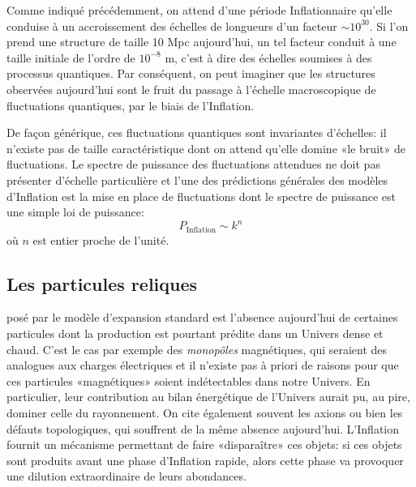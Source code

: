 Comme indiqué précédemment, on attend d'une période Inflationnaire qu'elle conduise à un accroissement des échelles de longueurs d'un facteur $\sim 10^{30}$. Si l'on prend une structure de taille 10 Mpc aujourd'hui, un tel facteur conduit à  une taille initiale de l'ordre de $10^{-8}$ m, c'est à dire des échelles soumises à des processus quantiques. Par conséquent, on peut imaginer que les structures observées aujourd'hui sont le fruit du passage à l'échelle macroscopique de fluctuations quantiques, par le biais de l'Inflation. 

De façon générique, ces fluctuations quantiques sont invariantes d'échelles: il n'existe pas de taille caractéristique dont on attend qu'elle domine «le bruit» de fluctuations. Le spectre de puissance des fluctuations attendues ne doit pas présenter d'échelle particulière et l'une des prédictions générales des modèles d'Inflation est la mise en place de fluctuations dont le spectre de puissance est une simple loi de puissance:
\begin{equation}
P_\mathrm{Inflation}\sim k^n
\end{equation}
où $n$ est entier proche de l'unité.

\subsection{Les particules reliques}
 posé par le modèle d'expansion standard est l'absence aujourd'hui de certaines particules dont la production est pourtant prédite dans un Univers dense et chaud. C'est le cas par exemple des \textit{monopôles} magnétiques, qui seraient des analogues aux charges électriques  et il n'existe pas à priori de raisons pour que ces particules «magnétiques» soient indétectables dans notre Univers. En particulier, leur contribution au bilan énergétique de l'Univers aurait pu, au pire, dominer celle du rayonnement.
On cite également souvent les axions ou bien les défauts topologiques, qui souffrent de la même absence aujourd'hui.
L'Inflation fournit un mécanisme permettant de faire «disparaître» ces objets: si ces objets sont produits avant une phase d'Inflation rapide, alors cette phase va provoquer une dilution extraordinaire de leurs abondances. 

